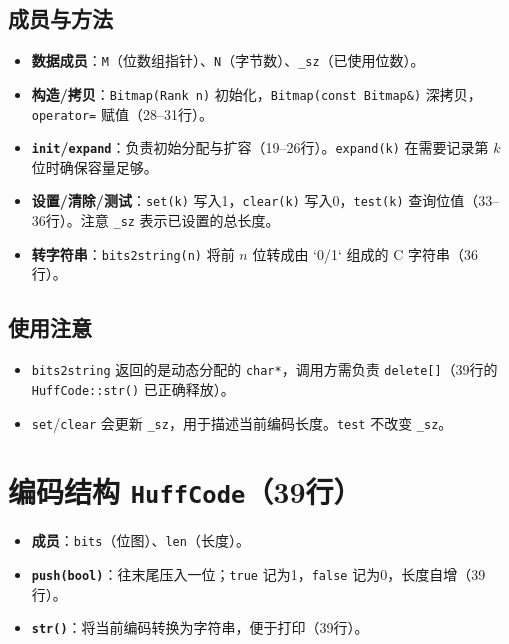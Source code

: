 \documentclass[12pt]{article}
\begin{document}
\subsection*{成员与方法}
\begin{itemize}[leftmargin=1.4em]
  \item \textbf{数据成员}：\texttt{M}（位数组指针）、\texttt{N}（字节数）、\texttt{\_sz}（已使用位数）。
  \item \textbf{构造/拷贝}：\texttt{Bitmap(Rank n)} 初始化，\texttt{Bitmap(const Bitmap\&)} 深拷贝，\texttt{operator=} 赋值（28--31行）。
  \item \textbf{\texttt{init}/\texttt{expand}}：负责初始分配与扩容（19--26行）。\texttt{expand(k)} 在需要记录第 \(k\) 位时确保容量足够。
  \item \textbf{设置/清除/测试}：\texttt{set(k)} 写入1，\texttt{clear(k)} 写入0，\texttt{test(k)} 查询位值（33--36行）。注意 \texttt{\_sz} 表示已设置的总长度。
  \item \textbf{转字符串}：\texttt{bits2string(n)} 将前 \(n\) 位转成由 `0/1` 组成的 C 字符串（36行）。
\end{itemize}

\subsection*{使用注意}
\begin{itemize}[leftmargin=1.4em]
  \item \texttt{bits2string} 返回的是动态分配的 \texttt{char*}，调用方需负责 \texttt{delete[]}（39行的 \texttt{HuffCode::str()} 已正确释放）。
  \item \texttt{set}/\texttt{clear} 会更新 \texttt{\_sz}，用于描述当前编码长度。\texttt{test} 不改变 \texttt{\_sz}。
\end{itemize}

\section{编码结构 \texttt{HuffCode}（39行）}
\begin{itemize}[leftmargin=1.4em]
  \item \textbf{成员}：\texttt{bits}（位图）、\texttt{len}（长度）。
  \item \textbf{\texttt{push(bool)}}：往末尾压入一位；\texttt{true} 记为1，\texttt{false} 记为0，长度自增（39行）。
  \item \textbf{\texttt{str()}}：将当前编码转换为字符串，便于打印（39行）。
\end{itemize}
\end{document}
